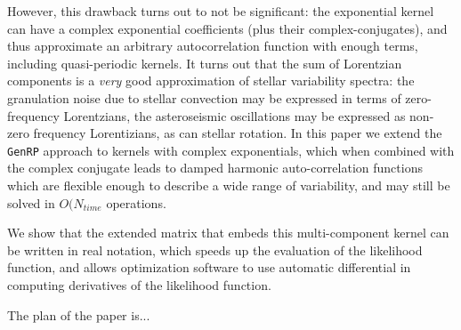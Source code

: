 \documentclass[manuscript, letterpaper]{aastex6}
\makeatletter
\let\origsection\section
\renewcommand\section{\@ifstar{\starsection}{\nostarsection}}
\newcommand\nostarsection[1]{\sectionprelude\origsection{#1}}
\newcommand\starsection[1]{\sectionprelude\origsection*{#1}}
\newcommand\sectionprelude{\vspace{1em}}
\makeatother
\begin{document}
However, this drawback turns out to not be significant:  the exponential kernel
can have a complex exponential coefficients (plus their complex-conjugates), and 
thus approximate an arbitrary autocorrelation function with enough terms, including
quasi-periodic kernels.  It turns out that the sum of Lorentzian components is
a {\it very} good approximation of stellar variability spectra:  the granulation
noise due to stellar convection may be expressed in terms of zero-frequency
Lorentzians, the asteroseismic oscillations may be expressed as non-zero frequency
Lorentizians, as can stellar rotation.  In this paper we extend the \texttt{GenRP} 
approach to kernels with complex exponentials, which when combined with the
complex conjugate leads to damped harmonic auto-correlation functions which
are flexible enough to describe a wide range of variability, and may still
be solved in $O(N_{time}$ operations.

We show that
the extended matrix that embeds this multi-component kernel can be written
in real notation, which speeds up the evaluation of the likelihood function,
and allows optimization software to use automatic differential in computing
derivatives of the likelihood function.

The plan of the paper is...


\section{Outline}
\end{document}
